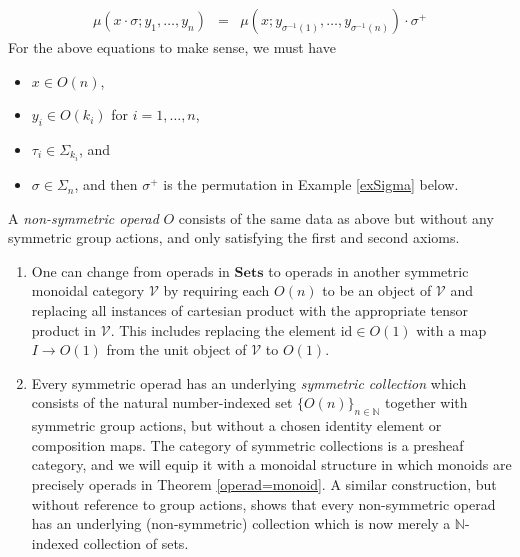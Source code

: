\documentclass{amsbook} %
\newcommand{\mb}{\mathbf}
\newcommand{\N}{\mathbb{N}}
\numberwithin{section}{chapter}
\begin{document}
\begin{Defi}
\begin{enumerate}
\[\begin{array}{rcl}
\mu(x \cdot \sigma; y_{1}, \ldots, y_{n}) & =  & \mu(x; y_{\sigma^{-1}(1)}, \ldots, y_{\sigma^{-1}(n)}) \cdot \sigma^{+}
\end{array}
\]
For the above equations to make sense, we must have
\begin{itemize}
\item $x \in O(n)$,
\item $y_{i} \in O(k_{i})$ for $i=1, \ldots, n$,
\item $\tau_{i} \in \Sigma_{k_{i}}$, and
\item $\sigma \in \Sigma_{n}$, and then $\sigma^{+}$ is the permutation in Example \ref{exSigma} below.
\end{itemize}
\end{enumerate}
\end{Defi}

\begin{Defi}
A \emph{non-symmetric operad} $O$ consists of the same data as above but without any symmetric group actions, and only satisfying the first and second axioms.
\end{Defi}

\begin{rem}
\begin{enumerate}
\item One can change from operads in $\mb{Sets}$\nomenclature[C]{$\mb{Sets}$}{of sets and functions} to operads in another symmetric monoidal category $\mathcal{V}$ by requiring each $O(n)$ to be an object of $\mathcal{V}$ and replacing all instances of cartesian product with the appropriate tensor product in $\mathcal{V}$.  This includes replacing the element $\textrm{id} \in O(1)$ with a map $I \rightarrow O(1)$ from the unit object of $\mathcal{V}$ to $O(1)$.
\item Every symmetric operad has an underlying \textit{symmetric collection} which consists of the natural number-indexed set $\{ O(n) \}_{n \in \N}$ together with symmetric group actions, but without a chosen identity element or composition maps.  The category of symmetric collections is a presheaf category, and we will equip it with a monoidal structure in which monoids are precisely operads in Theorem \ref{operad=monoid}.  A similar construction, but without reference to group actions, shows that every non-symmetric operad has an underlying (non-symmetric) collection which is now merely a $\N$-indexed collection of sets.
\end{enumerate}
\end{rem}
\end{document}
